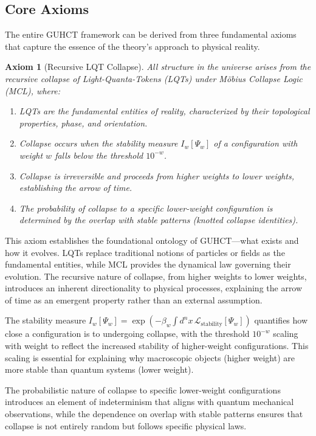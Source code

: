 \documentclass[11pt,a4paper]{article}
\makeatletter
\newtheorem{axiom}[theorem]{Axiom}
\renewenvironment{proof}[1][\proofname]{\par
  \pushQED{\qed}%
  \normalfont \topsep6\p@\@plus6\p@\relax
  \trivlist
  \item[\hskip\labelsep
        \itshape
    #1\@addpunct{.}]\ignorespaces
}{%
  \popQED\endtrivlist\@endpefalse
}
\makeatother
\begin{document}
\subsection{Core Axioms}
\label{subsec:core_axioms}

The entire GUHCT framework can be derived from three fundamental axioms that capture the essence of the theory's approach to physical reality.

\begin{axiom}[Recursive LQT Collapse]
\label{axiom:recursive_collapse}
All structure in the universe arises from the recursive collapse of Light-Quanta-Tokens (LQTs) under Möbius Collapse Logic (MCL), where:
\begin{enumerate}
    \item LQTs are the fundamental entities of reality, characterized by their topological properties, phase, and orientation.
    \item Collapse occurs when the stability measure $I_w[\Psi_w]$ of a configuration with weight $w$ falls below the threshold $10^{-w}$.
    \item Collapse is irreversible and proceeds from higher weights to lower weights, establishing the arrow of time.
    \item The probability of collapse to a specific lower-weight configuration is determined by the overlap with stable patterns (knotted collapse identities).
\end{enumerate}
\end{axiom}

\begin{proof}[Justification]
This axiom establishes the foundational ontology of GUHCT—what exists and how it evolves. LQTs replace traditional notions of particles or fields as the fundamental entities, while MCL provides the dynamical law governing their evolution. The recursive nature of collapse, from higher weights to lower weights, introduces an inherent directionality to physical processes, explaining the arrow of time as an emergent property rather than an external assumption.

The stability measure $I_w[\Psi_w] = \exp\left(-\beta_w \int d^nx \, \mathcal{L}_{\text{stability}}[\Psi_w]\right)$ quantifies how close a configuration is to undergoing collapse, with the threshold $10^{-w}$ scaling with weight to reflect the increased stability of higher-weight configurations. This scaling is essential for explaining why macroscopic objects (higher weight) are more stable than quantum systems (lower weight).

The probabilistic nature of collapse to specific lower-weight configurations introduces an element of indeterminism that aligns with quantum mechanical observations, while the dependence on overlap with stable patterns ensures that collapse is not entirely random but follows specific physical laws.
\end{proof}
\end{document}
